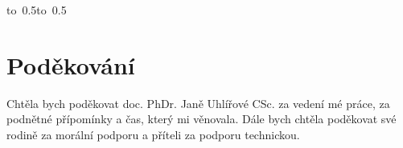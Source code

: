\documentclass[12pt,a4paper,singleside,openright]{report}
\let\openright=\cleardoublepage
\begin{document}
	\vspace{10mm}

	\hbox{\hbox to 0.5\hbox to 0.5}

	\vspace{20mm}
\newpage

	\openright

	\textcolor{white}{ }
	\vspace{150mm}

	\section*{Poděkování}

	Chtěla bych poděkovat doc. PhDr. Janě Uhlířové CSc. za vedení mé práce, za podnětné přípomínky a čas, který mi věnovala.
	Dále bych chtěla poděkovat své rodině za morální podporu a příteli za podporu technickou. 

\newpage

\end{document}
